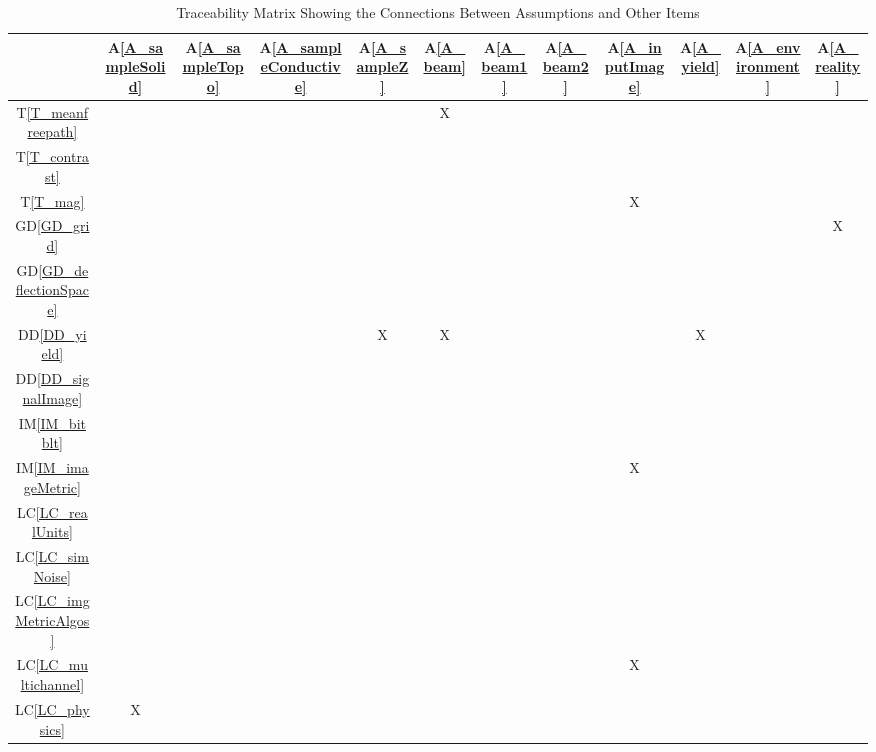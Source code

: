\documentclass[12pt]{article}
\newcommand{\dref}[1]{GD\ref{#1}}
\newcommand{\ddref}[1]{DD\ref{#1}}
\newcommand{\tref}[1]{T\ref{#1}}
\newcommand{\aref}[1]{A\ref{#1}}
\newcommand{\iref}[1]{IM\ref{#1}}
\newcommand{\lcref}[1]{LC\ref{#1}}
\begin{document}
\begin{table}[h!]
\centering
\begin{tabular}{|c|c|c|c|c|c|c|c|c|c|c|c|}
\hline
	& \aref{A_sampleSolid}
	& \aref{A_sampleTopo}
	& \aref{A_sampleConductive}
	& \aref{A_sampleZ}
	& \aref{A_beam}
	& \aref{A_beam1}
	& \aref{A_beam2}
	& \aref{A_inputImage}
	& \aref{A_yield}
	& \aref{A_environment}
	& \aref{A_reality}
\\ \hline
\tref{T_meanfreepath}      & & & & &X& & & & & &  \\ \hline
\tref{T_contrast}          & & & & & & & & & & &  \\ \hline
\tref{T_mag}               & & & & & & & &X& & &  \\ \hline
\dref{GD_grid}             & & & & & & & & & & &X \\ \hline
\dref{GD_deflectionSpace}  & & & & & & & & & & &  \\ \hline
\ddref{DD_yield}           & & & &X&X& & & &X& &  \\ \hline
\ddref{DD_signalImage}     & & & & & & & & & & &  \\ \hline
\iref{IM_bitblt}           & & & & & & & & & & &  \\ \hline
\iref{IM_imageMetric}      & & & & & & & &X& & &  \\ \hline
\lcref{LC_realUnits}       & & & & & & & & & & &  \\ \hline
\lcref{LC_simNoise}        & & & & & & & & & & &  \\ \hline
\lcref{LC_imgMetricAlgos}  & & & & & & & & & & &  \\ \hline
\lcref{LC_multichannel}    & & & & & & & &X& & &  \\ \hline
\lcref{LC_physics}         &X& & & & & & & & & &  \\ \hline
\end{tabular}
\caption{Traceability Matrix Showing the Connections Between Assumptions and Other Items}
\label{Table:A_trace}
\end{table}
\end{document}
